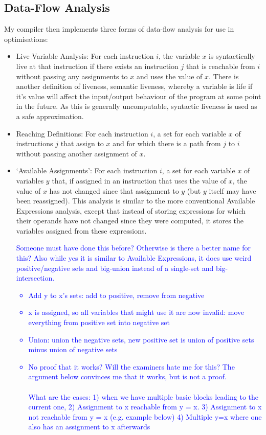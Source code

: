 \documentclass[12pt,twoside,notitlepage]{report}
\newcommand\note[1]{\textcolor{blue}{#1}}
\begin{document}
\subsection{Data-Flow Analysis}
My compiler then implements three forms of data-flow analysis for use in optimisations:
\begin{itemize}
	\item Live Variable Analysis: For each instruction $i$, the variable $x$ is syntactically live at that instruction if there exists an instruction $j$ that is reachable from $i$ without passing any assignments to $x$ and uses the value of $x$. There is another definition of liveness, semantic liveness, whereby a variable is life if it's value will affect the input/output behaviour of the program at some point in the future. As this is generally uncomputable, syntactic liveness is used as a safe approximation.
	\item Reaching Definitions: For each instruction $i$, a set for each variable $x$ of instructions $j$ that assign to $x$ and for which there is a path from $j$ to $i$ without passing another assignment of $x$.
	\item `Available Assignments': For each instruction $i$, a set for each variable $x$ of variables $y$ that, if assigned in an instruction that uses the value of $x$, the value of $x$ has not changed since that assignment to $y$ (but $y$ itself may have been reassigned). This analysis is similar to the more conventional Available Expressions analysis, except that instead of storing expressions for which their operands have not changed since they were computed, it stores the variables assigned from these expressions.
	\note{Someone must have done this before? Otherwise is there a better name for this? Also while yes it is similar to Available Expressions, it does use weird positive/negative sets and big-union instead of a single-set and big-intersection. \begin{itemize}
			\item Add y to x's sets: add to positive, remove from negative
			\item x is assigned, so all variables that might use it are now invalid: move everything from positive set into negative set
			\item Union: union the negative sets, new positive set is union of positive sets minus union of negative sets
			\item No proof that it works? Will the examiners hate me for this? The argument below convinces me that it works, but is not a proof.\\\\What are the cases: 1) when we have multiple basic blocks leading to the current one, 2) Assignment to x reachable from y = x. 3) Assignment to x not reachable from y = x (e.g. example below) 4) Multiple y=x where one also has an assignment to x afterwards

\end{itemize}}
\end{itemize}
\end{document}
